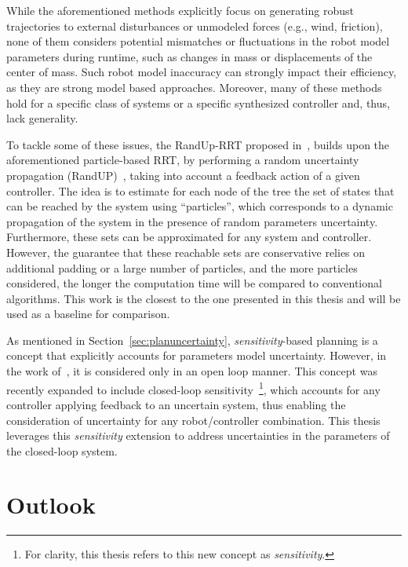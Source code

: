 While the aforementioned methods explicitly focus on generating robust trajectories to external disturbances or unmodeled forces (e.g., wind, friction), none of them considers potential mismatches or fluctuations in the robot model parameters during runtime, such as changes in mass or displacements of the center of mass.
Such robot model inaccuracy can strongly impact their efficiency, as they are strong model based approaches. 
Moreover, many of these methods hold for a specific class of systems or a specific synthesized controller and, thus, lack generality.

To tackle some of these issues, the RandUp-RRT proposed in~\cite{cRandUpRRT}, builds upon the aforementioned particle-based RRT, by performing a random uncertainty propagation (RandUP)~\cite{cRandUP}, taking into account a feedback action of a given controller.
The idea is to estimate for each node of the tree the set of states that can be reached by the system using ``particles'', which corresponds to a dynamic propagation of the system in the presence of random parameters uncertainty.
Furthermore, these sets can be approximated for any system and controller.
However, the guarantee that these reachable sets are conservative relies on additional padding or a large number of particles, and the more particles considered, the longer the computation time will be compared to conventional algorithms.
This work is the closest to the one presented in this thesis and will be used as a baseline for comparison.

As mentioned in Section~\ref{sec:planuncertainty}, \emph{sensitivity}-based planning is a concept that explicitly accounts for parameters model uncertainty.
However, in the work of~\cite{cSensi1,cSensi2}, it is considered only in an open loop manner.
This concept was recently expanded to include closed-loop sensitivity~\cite{cPi,cTh}\footnote{For clarity, this thesis refers to this new concept as \emph{sensitivity}.}, which accounts for any controller applying feedback to an uncertain system, thus enabling the consideration of uncertainty for any robot/controller combination.
This thesis leverages this \emph{sensitivity} extension to address uncertainties in the parameters of the closed-loop system.

\section{Outlook}

